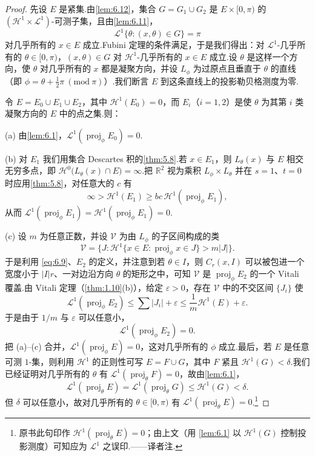 \begin{proof}
先设 $E$ 是紧集.由\cref{lem:6.12}，集合 $G=G_1\cup G_2$ 是 $E\times[0,\pi)$ 的 $(\mathcal{H}^1\times\mathscr{L}^1)$-可测子集，且由\cref{lem:6.11}，
\[
  \mathscr{L}^{1}\{\theta:(x,\theta)\in G\}=\pi
\]
对几乎所有的 $x\in E$ 成立.Fubini 定理的条件满足，于是我们得出：对 $\mathscr{L}^1$-几乎所有的 $\theta\in[0,\pi)$，$(x,\theta)\in G$ 对 $\mathcal{H}^1$-几乎所有的 $x\in E$ 成立.设 $\theta$ 是这样一个方向，使 $\theta$ 对几乎所有的 $x$ 都是凝聚方向，并设 $L_\phi$ 为过原点且垂直于 $\theta$ 的直线（即 $\phi=\theta+\frac{1}{2}\pi\ (\mathrm{mod}\ \pi)$）.我们断言 $E$ 到这条直线上的投影勒贝格测度为零.

令 $E=E_0\cup E_1\cup E_2$，其中 $\mathcal{H}^1(E_0)=0$，而 $E_i$（$i=1,2$）是使 $\theta$ 为其第 $i$ 类凝聚方向的 $E$ 中的点之集.则：

(a) 由\cref{lem:6.1}，$\mathscr{L}^1(\operatorname{proj}_{\phi}E_0)=0$.

(b) 对 $E_1$ 我们用集合 Descartes 积的\cref{thm:5.8}.若 $x\in E_1$，则 $L_\theta(x)$ 与 $E$ 相交无穷多点，即 $\mathcal{H}^0\bigl(L_\theta(x)\cap E\bigr)=\infty$.把 $\mathbb{R}^2$ 视为乘积 $L_\phi\times L_\theta$ 并在 $s=1$、$t=0$ 时应用\cref{thm:5.8}，对任意大的 $c$ 有
\[
  \infty>\mathcal{H}^{1}(E_1)\geq bc\,\mathcal{H}^{1}(\operatorname{proj}_{\phi}E_1),
\]
从而 $\mathscr{L}^1(\operatorname{proj}_{\phi}E_1)=\mathcal{H}^1(\operatorname{proj}_{\phi}E_1)=0$.

(c) 设 $m$ 为任意正数，并设 $\mathcal{V}$ 为由 $L_\phi$ 的子区间构成的类
\[
  \mathcal{V}=\{J:\mathcal{H}^{1}\{x\in E:\operatorname{proj}_{\phi}x\in J\}>m|J|\}.
\]
于是利用 \eqref{eq:6.9}、$E_2$ 的定义，并注意到若 $\theta\in I$，则 $C_r(x,I)$ 可以被包进一个宽度小于 $|I|r$、一对边沿方向 $\theta$ 的矩形之中，可知 $\mathcal{V}$ 是 $\operatorname{proj}_{\phi}E_2$ 的一个 Vitali 覆盖.由 Vitali 定理（\cref{thm:1.10}(b)），给定 $\varepsilon>0$，存在 $\mathcal{V}$ 中的不交区间 $\{J_i\}$ 使
\[
  \mathscr{L}^{1}(\operatorname{proj}_{\phi}E_2)\leq\sum|J_i|+\varepsilon\leq\frac{1}{m}\mathcal{H}^{1}(E)+\varepsilon.
\]
于是由于 $1/m$ 与 $\varepsilon$ 可以任意小，
\[
  \mathscr{L}^{1}(\operatorname{proj}_{\phi}E_2)=0.
\]
把 (a)--(c) 合并，$\mathscr{L}^1(\operatorname{proj}_{\phi}E)=0$，这对几乎所有的 $\phi$ 成立.最后，若 $E$ 是任意可测 $1$-集，则利用 $\mathcal{H}^1$ 的正则性可写 $E=F\cup G$，其中 $F$ 紧且 $\mathcal{H}^1(G)<\delta$.我们已经证明对几乎所有的 $\theta$ 有 $\mathscr{L}^1(\operatorname{proj}_{\theta}F)=0$，故由\cref{lem:6.1}，
\[
  \mathscr{L}^{1}(\operatorname{proj}_{\theta}E)=\mathscr{L}^{1}(\operatorname{proj}_{\theta}G)\leq\mathcal{H}^{1}(G)<\delta.
\]
但 $\delta$ 可以任意小，故对几乎所有的 $\theta\in[0,\pi)$ 有 $\mathscr{L}^1(\operatorname{proj}_{\theta}E)=0$.\footnote{原书此句印作 $\mathscr{H}^1(\operatorname{proj}_{\theta}E)=0$；由上文（用 \cref{lem:6.1} 以 $\mathcal{H}^1(G)$ 控制投影测度）可知应为 $\mathscr{L}^1$ 之误印.——译者注.}
\end{proof}

